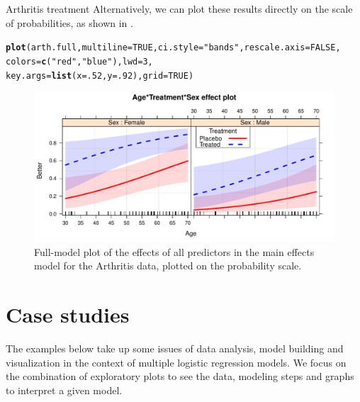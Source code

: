 \documentclass[11pt]{book}\usepackage[]{graphicx}\usepackage[]{color}
\makeatletter
\newcommand{\hlnum}[1]{\textcolor[rgb]{0.686,0.059,0.569}{#1}}%
\newcommand{\hlstr}[1]{\textcolor[rgb]{0.192,0.494,0.8}{#1}}%
\newcommand{\hlstd}[1]{\textcolor[rgb]{0.345,0.345,0.345}{#1}}%
\newcommand{\hlkwc}[1]{\textcolor[rgb]{0.333,0.667,0.333}{#1}}%
\newcommand{\hlkwd}[1]{\textcolor[rgb]{0.737,0.353,0.396}{\textbf{#1}}}%
\newenvironment{kframe}{%
 \def\at@end@of@kframe{}%
 \ifinner\ifhmode%
  \def\at@end@of@kframe{\end{minipage}}%
  \begin{minipage}{\columnwidth}%
 \fi\fi%
 \def\FrameCommand##1{\hskip\@totalleftmargin \hskip-\fboxsep
 \colorbox{shadecolor}{##1}\hskip-\fboxsep
     \hskip-\linewidth \hskip-\@totalleftmargin \hskip\columnwidth}%
 \MakeFramed {\advance\hsize-\width
   \@totalleftmargin\z@ \linewidth\hsize
   \@setminipage}}%
 {\par\unskip\endMakeFramed%
 \at@end@of@kframe}
\newenvironment{knitrout}{}{} %
\renewenvironment{knitrout}{\small\renewcommand{\baselinestretch}{.85}}{} %
\makeatother
\begin{document}
\begin{Example}{Arthritis treatment}
\begin{knitrout}
\end{knitrout}
Alternatively, we can plot these results directly on the scale of probabilities, as
shown in .
\begin{knitrout}
\color{fgcolor}\begin{kframe}
\begin{alltt}
\hlkwd{plot}\hlstd{(arth.full,} \hlkwc{multiline}\hlstd{=}\hlnum{TRUE}\hlstd{,} \hlkwc{ci.style}\hlstd{=}\hlstr{"bands"}\hlstd{,} \hlkwc{rescale.axis}\hlstd{=}\hlnum{FALSE}\hlstd{,}
     \hlkwc{colors} \hlstd{=} \hlkwd{c}\hlstd{(}\hlstr{"red"}\hlstd{,} \hlstr{"blue"}\hlstd{),} \hlkwc{lwd}\hlstd{=}\hlnum{3}\hlstd{,}
     \hlkwc{key.args}\hlstd{=}\hlkwd{list}\hlstd{(}\hlkwc{x}\hlstd{=}\hlnum{.52}\hlstd{,} \hlkwc{y}\hlstd{=}\hlnum{.92}\hlstd{),} \hlkwc{grid}\hlstd{=}\hlnum{TRUE}\hlstd{)}
\end{alltt}
\end{kframe}\begin{figure}[!htbp]


\centerline{\includegraphics[width=.8\textwidth]{ch07/fig/arth-effplot3-1} }

\caption[Full-model plot of the effects of all predictors in the main effects model for the Arthritis data, plotted on the probability scale]{Full-model plot of the effects of all predictors in the main effects model for the Arthritis data, plotted on the probability scale.\label{fig:arth-effplot3}}
\end{figure}


\end{knitrout}

\end{Example}

\section{Case studies}

The examples below take up some issues of data analysis, model building and visualization
in the context of multiple logistic regression models.  We focus on the combination of
exploratory plots to see the data, modeling steps and graphs to interpret a given model.
\end{document}

